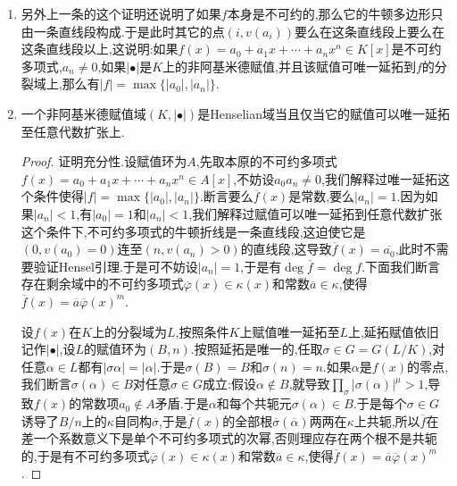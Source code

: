 \begin{enumerate}
\begin{proof}
		不妨设$a_n=1$.倘若$f$本身是不可约多项式,那么它的不同根之间可经扩张的某个自同构映射,因为如果$\sigma$是扩张的自同构,$w$是一个延拓赋值,那么$w(\sigma(\bullet))$也是一个延拓赋值,这导致所有根在$w$下的取值是相同的,于是$f=f_1$.
		
		现在对$n$归纳,当$n=1$时没什么需要证的,设$n\ge2$,设$p(x)$是$\alpha_1$的极小多项式,那么$g(x)=f(x)/p(x)\in K[x]$.按照$p(x)$的所有根的赋值相同,说明$p(x)\mid f_1(x)$.再记$g_1(x)=f_1(x)/p(x)$,那么$g(x)=g_1(x)\prod_{j=2}^rf_j(x)$,并且$\deg g<\deg f$,于是归纳法说明$f_j(x),g_1(x)\in K[x]$.完成归纳.
	\end{proof}
	\item 另外上一条的这个证明还说明了如果$f$本身是不可约的,那么它的牛顿多边形只由一条直线段构成.于是此时其它的点$(i,v(a_i))$要么在这条直线段上要么在这条直线段以上,这说明:如果$f(x)=a_0+a_1x+\cdots+a_nx^n\in K[x]$是不可约多项式,$a_n\not=0$,如果$|\bullet|$是$K$上的非阿基米德赋值,并且该赋值可唯一延拓到$f$的分裂域上,那么有$|f|=\max\{|a_0|,|a_n|\}$.
	\item 一个非阿基米德赋值域$(K,|\bullet|)$是Henselian域当且仅当它的赋值可以唯一延拓至任意代数扩张上.
	\begin{proof}
		
		证明充分性.设赋值环为$A$,先取本原的不可约多项式$f(x)=a_0+a_1x+\cdots+a_nx^n\in A[x]$,不妨设$a_0a_n\not=0$,我们解释过唯一延拓这个条件使得$|f|=\max\{|a_0|,|a_n|\}$.断言要么$\overline{f}(x)$是常数,要么$|a_n|=1$.因为如果$|a_n|<1$,有$|a_0|=1$和$|a_n|<1$,我们解释过赋值可以唯一延拓到任意代数扩张这个条件下,不可约多项式的牛顿折线是一条直线段,这迫使它是$(0,v(a_0)=0)$连至$(n,v(a_n)>0)$的直线段,这导致$\overline{f}(x)=\overline{a_0}$,此时不需要验证Hensel引理.于是可不妨设$|a_n|=1$,于是有$\deg\overline{f}=\deg f$.下面我们断言存在剩余域中的不可约多项式$\overline{\varphi}(x)\in\kappa(x)$和常数$\overline{a}\in\kappa$,使得$\overline{f}(x)=\overline{a}\overline{\varphi}(x)^m$.
		
		\qquad
		
		设$f(x)$在$K$上的分裂域为$L$,按照条件$K$上赋值唯一延拓至$L$上,延拓赋值依旧记作$|\bullet|$,设$L$的赋值环为$(B,n)$.按照延拓是唯一的,任取$\sigma\in G=G(L/K)$,对任意$\alpha\in L$都有$|\sigma\alpha|=|\alpha|$.于是$\sigma(B)=B$和$\sigma(n)=n$.如果$\alpha$是$f(x)$的零点,我们断言$\sigma(\alpha)\in B$对任意$\sigma\in G$成立:假设$\alpha\not\in B$,就导致$\prod_{\sigma}|\sigma(\alpha)|^{\mu}>1$,导致$f(x)$的常数项$a_0\not\in A$矛盾.于是$\alpha$和每个共轭元$\sigma(\alpha)\in B$.于是每个$\sigma\in G$诱导了$B/n$上的$\kappa$自同构$\overline{\sigma}$,于是$\overline{f}(x)$的全部根$\overline{\sigma}(\overline{\alpha})$两两在$\kappa$上共轭,所以$\overline{f}$在差一个系数意义下是单个不可约多项式的次幂,否则理应存在两个根不是共轭的,于是有不可约多项式$\overline{\varphi}(x)\in\kappa(x)$和常数$\overline{a}\in\kappa$,使得$\overline{f}(x)=\overline{a}\overline{\varphi}(x)^m$.
		

\end{proof}
\end{enumerate}

